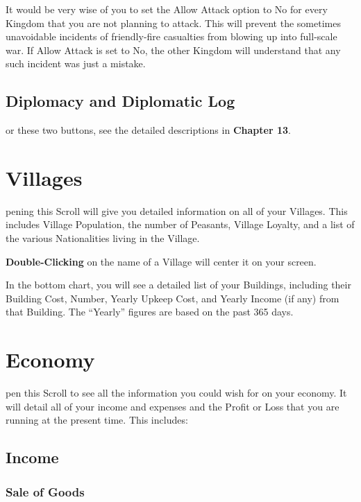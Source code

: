 It would be very wise of you to set the Allow Attack option to No for every Kingdom that you are not planning to attack. This will prevent the sometimes unavoidable incidents of friendly-fire casualties from blowing up into full-scale war. If Allow Attack is set to No, the other Kingdom will understand that any such incident was just a mistake.

\subsection{Diplomacy and Diplomatic Log}

or these two buttons, see the detailed descriptions in \textbf{Chapter 13}.

\section{Villages}


pening this Scroll will give you detailed information on all of your Villages. This includes Village Population, the number of Peasants, Village Loyalty, and a list of the various Nationalities living in the Village.

\textbf{Double-Clicking} on the name of a Village will center it on your screen.

In the bottom chart, you will see a detailed list of your Buildings, including their Building Cost, Number, Yearly Upkeep Cost, and Yearly Income (if any) from that Building. The “Yearly” figures are based on the past 365 days.

\section{Economy}


pen this Scroll to see all the information you could wish for on your economy. It will detail all of your income and expenses and the Profit or Loss that you are running at the present time. This includes:

\subsection{Income}


\subsubsection{Sale of Goods}

